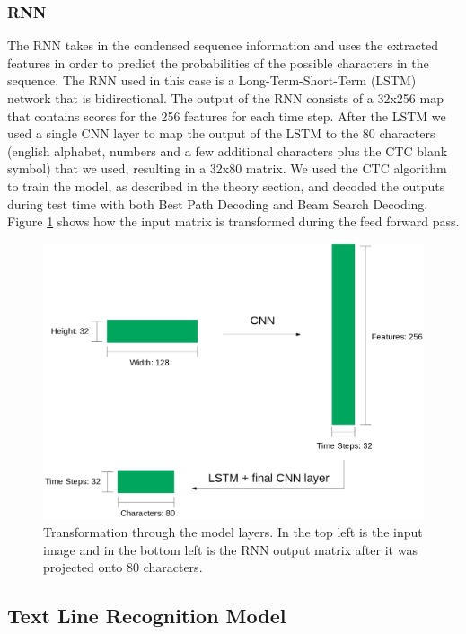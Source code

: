 \documentclass{article}
\begin{document}
\subsubsection{RNN}
The RNN takes in the condensed sequence information and uses the extracted features in order to predict the probabilities of the possible characters in the sequence. The RNN used in this case is a Long-Term-Short-Term (LSTM) network that is bidirectional. The output of the RNN consists of a 32x256 map that contains scores for the 256 features for each time step. After the LSTM we used a single CNN layer to map the output of the LSTM to the 80 characters (english alphabet, numbers and a few additional characters plus the CTC blank symbol) that we used, resulting in a 32x80 matrix. We used the CTC algorithm to train the model, as described in the theory section, and decoded the outputs during test time with both Best Path Decoding and Beam Search Decoding. Figure \ref{fig:featureshapes} shows how the input matrix is transformed during the feed forward pass.
\begin{figure}[H]
\begin{center}
\includegraphics[scale=0.25]{rsz_pipeline}
\end{center}
\caption{Transformation through the model layers. In the top left is the input image and in the bottom left is the RNN output matrix after it was projected onto 80 characters.}
\label{fig:featureshapes}
\end{figure}
\subsection{Text Line Recognition Model}
\end{document}

